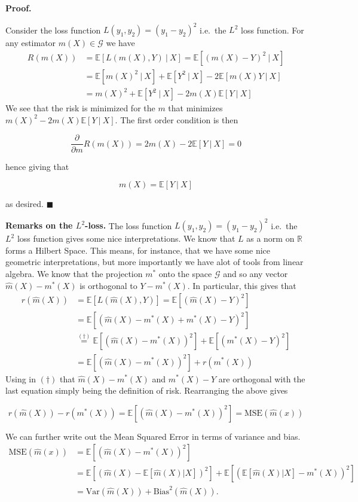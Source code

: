 \documentclass[a4paper,12pt,openany]{book}
\begin{document}
\textbf{Proof.}

Consider the loss function \(L(y_1,y_2)=(y_1-y_2)^2\) i.e.~the \(L^2\) loss function. For any estimator \(m(X)\in \mathcal G\) we have
\begin{align*}
R(m(X))&=\mathbb E[L(m(X),Y)\ \vert\ X]=\mathbb E[(m(X)-Y)^2\ \vert\ X]\\
&=\mathbb E[m(X)^2\ \vert\ X]+\mathbb E[Y^2\ \vert\ X]-2\mathbb E[m(X)Y\ \vert\ X]\\
&=m(X)^2+\mathbb E[Y^2\ \vert\ X]-2m(X)\mathbb E[Y\ \vert\ X]
\end{align*}
We see that the risk is minimized for the \(m\) that minimizes \(m(X)^2-2m(X)\mathbb E[Y\ \vert\ X]\). The first order condition is then

\[
\frac{\partial}{\partial m}R(m(X))=2m(X)-2\mathbb E[Y\ \vert\ X]=0
\]

hence giving that

\[
m(X)=\mathbb E[Y\ \vert\ X]
\]

as desired. \(\blacksquare\)

\textbf{Remarks on the \(L^2\)-loss.} The loss function \(L(y_1,y_2)=(y_1-y_2)^2\) i.e.~the \(L^2\) loss function gives some nice interpretations. We know that \(L\) as a norm on \(\mathbb R\) forms a Hilbert Space. This means, for instance, that we have some nice geometric interpretations, but more importantly we have alot of tools from linear algebra. We know that the projection \(m^*\) onto the space \(\mathcal G\) and so any vector \(\hat m(X)-m^*(X)\) is orthogonal to \(Y-m^*(X)\). In particular, this gives that
\begin{align*}
r(\hat m(X))&=\mathbb E[L(\hat m(X),Y)]=\mathbb E\left[(\hat m(X)-Y)^2\right]\\
&=\mathbb E\left[(\hat m(X)-m^*(X)+m^*(X)-Y)^2\right]\\
&\stackrel{(\dagger)}{=}\mathbb E\left[(\hat m(X)-m^*(X))^2\right]+\mathbb E\left[(m^*(X)-Y)^2\right]\\
&=\mathbb E\left[(\hat m(X)-m^*(X))^2\right]+r(m^*(X))
\end{align*}
Using in \((\dagger)\) that \(\hat m(X)-m^*(X)\) and \(m^*(X)-Y\) are orthogonal with the last equation simply being the definition of risk. Rearranging the above gives

\[
r(\hat m(X))-r(m^*(X))=\mathbb E\left[(\hat m(X)-m^*(X))^2\right]=\text{MSE}(\hat m(x))
\]

We can further write out the Mean Squared Error in terms of variance and bias.
\begin{align*}
\text{MSE}(\hat m(x))&=\mathbb E\left[(\hat m(X)-m^*(X))^2\right]\\
&=\mathbb E\left[(\hat m(X)-\mathbb E[\hat m(X)\vert X])^2\right]+\mathbb E\left[(\mathbb E[\hat m(X)\vert X]-m^*(X))^2\right]\\
&=\text{Var}(\hat m(X))+\text{Bias}^2(\hat m(X)).
\end{align*}
\end{document}
